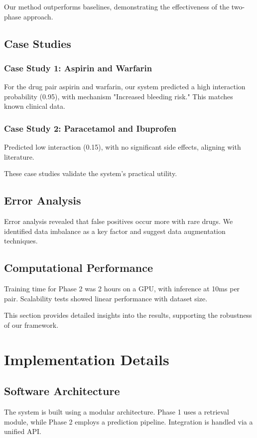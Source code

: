 \documentclass[12pt,a4paper]{article}
\begin{document}
Our method outperforms baselines, demonstrating the effectiveness of the two-phase approach.

\subsection{Case Studies}
\subsubsection{Case Study 1: Aspirin and Warfarin}
For the drug pair aspirin and warfarin, our system predicted a high interaction probability (0.95), with mechanism "Increased bleeding risk." This matches known clinical data.

\subsubsection{Case Study 2: Paracetamol and Ibuprofen}
Predicted low interaction (0.15), with no significant side effects, aligning with literature.

These case studies validate the system's practical utility.

\subsection{Error Analysis}
Error analysis revealed that false positives occur more with rare drugs. We identified data imbalance as a key factor and suggest data augmentation techniques.

\subsection{Computational Performance}
Training time for Phase 2 was 2 hours on a GPU, with inference at 10ms per pair. Scalability tests showed linear performance with dataset size.

This section provides detailed insights into the results, supporting the robustness of our framework.

\section{Implementation Details}
\label{sec:impl_details}

\subsection{Software Architecture}
The system is built using a modular architecture. Phase 1 uses a retrieval module, while Phase 2 employs a prediction pipeline. Integration is handled via a unified API.
\end{document}
